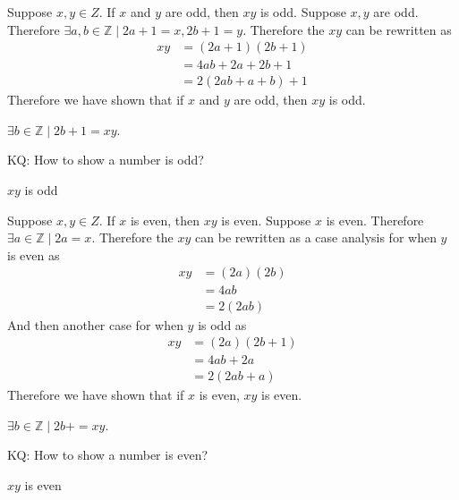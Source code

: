 \documentclass[openany, 12pt]{book}
\begin{document}
\begin{exercise}{}{}
	Suppose $x, y \in Z$. If $x$ and $y$ are odd, then $x y$ is odd.
	\tcblower
	Suppose $x,y$ are odd.  Therefore $\exists a,b\in\mathbb{Z}\mid 2a+1=x,
		2b+1=y$. Therefore the $xy$ can be rewritten as
	\begin{align*}
		xy & = (2a+1)(2b+1)       \\
		   & = 4ab + 2a + 2b + 1  \\
		   & = 2(2ab + a + b) + 1
	\end{align*}
	Therefore we have shown that if $x$ and $y$ are odd, then $x y$ is odd.

	\begin{alist}
		\item $\exists b\in\mathbb{Z}\mid 2b+1=xy$.
		\item KQ: How to show a number is odd?
		\item $xy$ is odd
	\end{alist}
\end{exercise}

\begin{exercise}{}{}
	Suppose $x, y \in Z$. If $x$ is even, then $x y$ is even.
	\tcblower
	Suppose $x$ is even.  Therefore $\exists a\in\mathbb{Z}\mid 2a=x$.
	Therefore the $xy$ can be rewritten as a case analysis for when $y$ is even
	as
	\begin{align*}
		xy & = (2a)(2b) \\
		   & = 4ab      \\
		   & = 2(2ab)
	\end{align*}
	And then another case for when $y$ is odd as
	\begin{align*}
		xy & = (2a)(2b+1) \\
		   & = 4ab +2a    \\
		   & = 2(2ab+a)
	\end{align*}
	Therefore we have shown that if $x$ is even, $xy$ is even.

	\begin{alist}
		\item $\exists b\in\mathbb{Z}\mid 2b+=xy$.
		\item KQ: How to show a number is even?
		\item $xy$ is even
	\end{alist}
\end{exercise}
\end{document}
